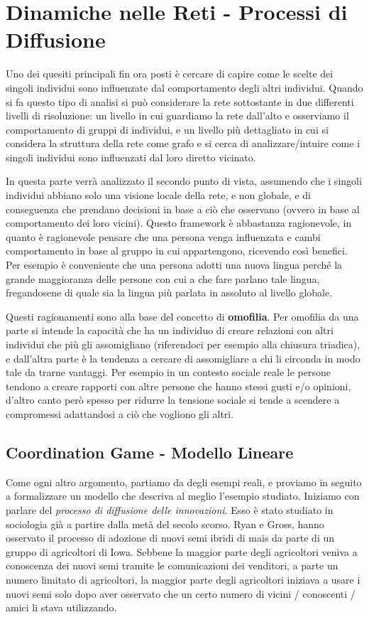 \chapter{Dinamiche nelle Reti - Processi di Diffusione}

Uno dei quesiti principali fin ora posti è cercare di capire come le scelte dei singoli individui sono influenzate dal comportamento degli altri individui. Quando si fa questo tipo di analisi si può considerare la rete sottostante in due differenti livelli di risoluzione: un livello in cui guardiamo la rete dall'alto e osserviamo il comportamento di gruppi di individui, e un livello più dettagliato in cui si considera la struttura della rete come grafo e si cerca di analizzare/intuire come i singoli individui sono influenzati dal loro diretto vicinato.

In questa parte verrà analizzato il secondo punto di vista, assumendo che i singoli individui abbiano solo una visione locale della rete, e non globale, e di conseguenza che prendano decisioni in base a ciò che osservano (ovvero in base al comportamento dei loro vicini). Questo framework è abbastanza ragionevole, in quanto è ragionevole pensare che una persona venga influenzata e cambi comportamento in base al gruppo in cui appartengono, ricevendo così benefici. Per esempio è conveniente che una persona adotti una nuova lingua perché la grande maggioranza delle persone con cui a che fare parlano tale lingua, fregandosene di quale sia la lingua più parlata in assoluto al livello globale.

Questi ragionamenti sono alla base del concetto di \textbf{omofilia}. Per omofilia da una parte si intende la capacità che ha un individuo di creare relazioni con altri individui che più gli assomigliano (riferendoci per esempio alla chiusura triadica), e dall'altra parte è la tendenza a cercare di assomigliare a chi li circonda in modo tale da trarne vantaggi. Per esempio in un contesto sociale reale le persone tendono a creare rapporti con altre persone che hanno stessi gusti e/o opinioni, d'altro canto però spesso per ridurre la tensione sociale si tende a scendere a compromessi adattandosi a ciò che vogliono gli altri.

\section{Coordination Game - Modello Lineare}

Come ogni altro argomento, partiamo da degli esempi reali, e proviamo in seguito a formalizzare un modello che descriva al meglio l'esempio studiato.
Iniziamo con parlare del \textit{processo di diffusione delle innovazioni}. Esso è stato studiato in sociologia già a partire dalla metà del secolo scorso. Ryan e Gross, hanno osservato il processo di adozione di nuovi semi ibridi di mais da parte di un gruppo di agricoltori di Iowa. Sebbene la maggior parte degli agricoltori veniva a conoscenza dei nuovi semi tramite
le comunicazioni dei venditori, a parte un numero limitato di agricoltori, la maggior parte degli agricoltori iniziava a usare i nuovi semi solo dopo aver osservato che un certo numero di vicini / conoscenti / amici li stava utilizzando.

